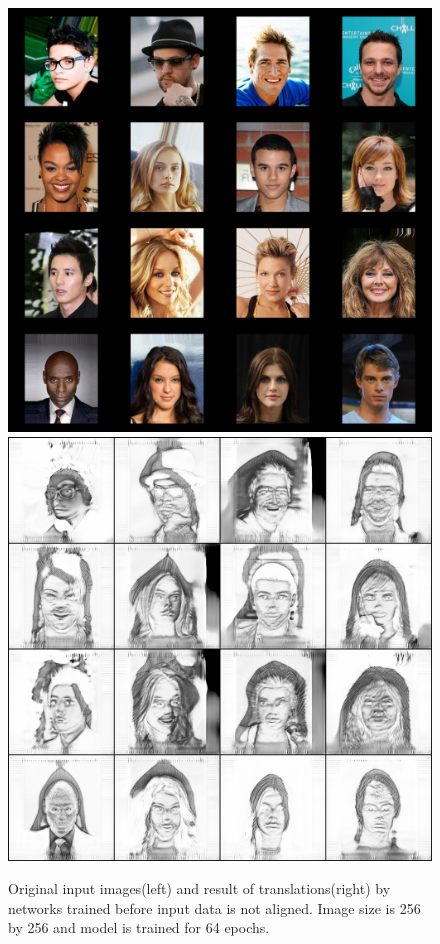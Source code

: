 \begin{figure}[ht]
\begin{center}
    \includegraphics[scale=0.16]{Graphics/pic2ske_origin_before_clean.png}
    \includegraphics[scale=0.16]{Graphics/pic2ske_result_before_clean.png}
    \end{center}
    \caption{Original input images(left) and result of translations(right) by networks trained before input data is not aligned. Image size is 256 by 256 and model is trained for 64 epochs.}\label{FIG:before_refinement}
\end{figure}


